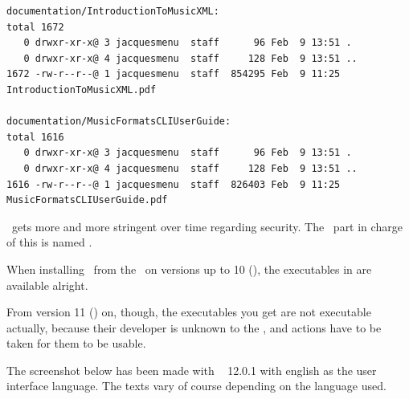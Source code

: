 \begin{lstlisting}[language=Terminal]
documentation/IntroductionToMusicXML:
total 1672
   0 drwxr-xr-x@ 3 jacquesmenu  staff      96 Feb  9 13:51 .
   0 drwxr-xr-x@ 4 jacquesmenu  staff     128 Feb  9 13:51 ..
1672 -rw-r--r--@ 1 jacquesmenu  staff  854295 Feb  9 11:25 IntroductionToMusicXML.pdf

documentation/MusicFormatsCLIUserGuide:
total 1616
   0 drwxr-xr-x@ 3 jacquesmenu  staff      96 Feb  9 13:51 .
   0 drwxr-xr-x@ 4 jacquesmenu  staff     128 Feb  9 13:51 ..
1616 -rw-r--r--@ 1 jacquesmenu  staff  826403 Feb  9 11:25 MusicFormatsCLIUserGuide.pdf
\end{lstlisting}

\MacOS\ gets more and more stringent over time regarding security. The \OS\ part in charge of this is named \Gatekeeper. 

When installing \mf\ from the \repo\ on versions up to 10 (), the executables in  are available alright.

From version 11 () on, though, the executables you get are not executable actually, because their developer is unknown to the \OS, and actions have to be taken for them to be usable.

The screenshot below has been made with \MacOS\  12.0.1 with english as the user interface language. The texts vary of course depending on the language used.

